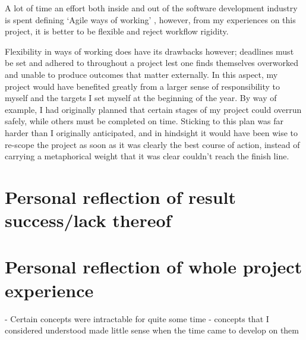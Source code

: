 A lot of time an effort both inside and out of the software development industry
is spent defining `Agile ways of working' \autocite{spolsky_you_2006}, however, from my experiences on this
project, it is better to be flexible and reject workflow rigidity. 

Flexibility in ways of working does have its drawbacks however; deadlines must
be set and adhered to throughout a project lest one finds themselves overworked
and unable to produce outcomes that matter externally. In this aspect, my
project would have benefited greatly from a larger sense of responsibility to
myself and the targets I set myself at the beginning of the year. By way of
example, I had originally planned that certain stages of my project could
overrun safely, while others must be completed on time. Sticking to this plan
was far harder than I originally anticipated, and in hindsight it would have been
wise to re-scope the project as soon as it was clearly the best course of action,
instead of carrying a metaphorical weight that it was clear couldn't reach the
finish line.

\section{Personal reflection of result success/lack thereof}

\section{Personal reflection of whole project experience}
 - Certain concepts were intractable for quite some time 
 - concepts that I considered understood made little sense when the time came to
 develop on them 